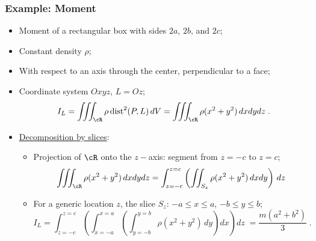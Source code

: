\begin{frame}
  \frametitle{Example: Moment}
  
  \begin{itemize}
    \item Moment of a rectangular box with sides $2a$, $2b$, and $2c$;
    \item Constant density $\rho$;
    \item With respect to an axis through the center, perpendicular to a face;
    \item Coordinate system $Oxyz$, $L=Oz$;
    $$I_L = \int\!\!\!\int\!\!\!\int_{\cR} \rho\, \text{dist}^2(P,L)\, dV = \int\!\!\!\int\!\!\!\int_{\cR} \rho (x^2+y^2)\, dxdydz\; .$$
    \item \underline{Decomposition by slices}:
    \begin{itemize}
    \item Projection of $\cR$ onto the $z-$axis: segment from $z=-c$ to $z=c$;
%
$$\iiint_{\cR} \rho (x^2+y^2)\, dxdydz = \int_{z=-c}^{z=c} \left( \iint_{S_z} \rho (x^2+y^2)\, dxdy \right) \, dz$$
%    
    \item For a generic location $z$, the slice $S_z$: $-a \leqslant x \leqslant a$, $-b \leqslant y \leqslant b$;
%
$$I_L = \int_{z=-c}^{z=c} \left(\int_{x=-a}^{x=a} \left( \int_{y=-b}^{y=b} \rho (x^2+y^2) \, dy \right)  dx\right)  dz\; = \frac{m(a^2+b^2)}{3} \; .$$
%

\end{itemize}
  \end{itemize}
\end{frame}

